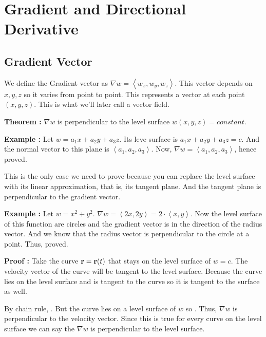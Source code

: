 

\chapter{Gradient and Directional Derivative}

\bigbreak
\section{Gradient Vector}

We define the Gradient vector as $\nabla w = \left< w_x, w_y, w_z \right>$.
This vector depends on $x, y, z$ so it varies from point to point. 
This represents a vector at each point $(x, y, z)$. This is what  we'll later call a vector field.

{\bf Theorem : } $\nabla w$ is perpendicular to the level surface $w(x, y, z) = constant$.

{\bf Example : } Let $w = a_1 x + a_2 y + a_3 z$. 
Its leve surface is $a_1 x + a_2 y + a_3 z = c$. 
And the normal vector to this plane is $\left< a_1, a_2, a_3 \right>$.
Now, $\nabla w  = \left< a_1, a_2, a_3 \right>$, hence proved.

This is the only case we need to prove because you can replace the level surface with its linear approximation, that is, its tangent plane.
And the tangent plane is perpendicular to the gradient vector.

{\bf Example : } Let $ w = x^2 + y^2 $.
$\nabla w = \left< 2x, 2y \right> = 2 \cdot \left< x, y \right> $. 
Now the level surface of this function are circles and the gradient vector is in the direction of the radius vector.
And we know that the radius vector is perpendicular to the circle at a point. Thus, proved.


{\bf Proof : } Take the curve ${\bf r} = {\bf r}(t)$ that stays on the level surface of $w = c$.
The velocity vector of the curve will be tangent to the level surface.  
Because the curve lies on the level surface and  is tangent to the curve so it is tangent to the surface as well.

By chain rule, . 
But the curve lies on a level surface of $w$ so .
Thus, $\nabla w$ is perpendicular to the velocity vector. 
Since this is true for every curve on the level surface we can say the $\nabla w$ is perpendicular to the level surface.

